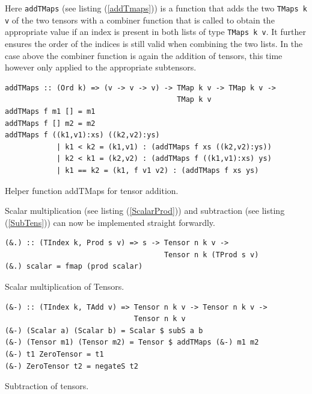 \documentclass[a4paper,12pt, DIV=14, BCOR=5mm, twoside, headsepline, numbers=noenddot]{scrbook}
\begin{document}
Here \texttt{addTMaps} (see listing (\ref{addTmaps})) is a function that adds the two \texttt{TMaps k v} of the two tensors with a combiner function that is called to obtain the appropriate value if an index is present in both lists of type \texttt{TMaps k v}. It further ensures the order of the indices is still valid when combining the two lists. In the case above the combiner function is again the addition of tensors, this time however only applied to the appropriate subtensors. 

\begin{listing}[hbt!] 
\begin{verbatim}
addTMaps :: (Ord k) => (v -> v -> v) -> TMap k v -> TMap k v ->
                                        TMap k v 
addTMaps f m1 [] = m1 
addTMaps f [] m2 = m2 
addTMaps f ((k1,v1):xs) ((k2,v2):ys) 
            | k1 < k2 = (k1,v1) : (addTMaps f xs ((k2,v2):ys))
            | k2 < k1 = (k2,v2) : (addTMaps f ((k1,v1):xs) ys)
            | k1 == k2 = (k1, f v1 v2) : (addTMaps f xs ys) 
\end{verbatim} 
\caption{Helper function addTMaps for tensor addition.}\label{addTmaps}
\end{listing}

Scalar multiplication (see listing (\ref{ScalarProd})) and subtraction (see listing (\ref{SubTens})) can now be implemented straight forwardly.

\begin{listing}[hbt!] 
\begin{verbatim}
(&.) :: (TIndex k, Prod s v) => s -> Tensor n k v ->
                                     Tensor n k (TProd s v)
(&.) scalar = fmap (prod scalar)
\end{verbatim} 
\caption{Scalar multiplication of Tensors.}\label{ScalarProd}
\end{listing}

\begin{listing}[hbt!] 
\begin{verbatim}
(&-) :: (TIndex k, TAdd v) => Tensor n k v -> Tensor n k v ->
                              Tensor n k v
(&-) (Scalar a) (Scalar b) = Scalar $ subS a b
(&-) (Tensor m1) (Tensor m2) = Tensor $ addTMaps (&-) m1 m2
(&-) t1 ZeroTensor = t1
(&-) ZeroTensor t2 = negateS t2
\end{verbatim} 
\caption{Subtraction of tensors.}\label{SubTens}
\end{listing}
\end{document}
